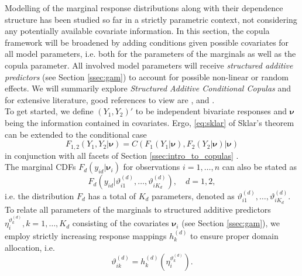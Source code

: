 
Modelling of the marginal response distributions along with their dependence structure has been studied so far in a strictly parametric context, not considering any potentially available covariate information. In this section, the copula framework will be broadened by adding conditions given possible covariates for all model parameters, i.e. both for the parameters of the marginals as well as the copula parameter. All involved model parameters will receive \textit{structured additive predictors} (see Section \ref{ssec:gam}) to account for possible non-linear or random effects. We will summarily explore \textit{Structured Additive Conditional Copulas} and for extensive literature, good references to view are \cite{klein2016simultaneous}, \cite{vatter2019gamcopula} and \cite{marra1605bivariate}. \\

To get started, we define $(Y_1, Y_2)'$ to be independent bivariate responses and $\bm{\nu}$ being the information contained in covariates. Ergo, \autoref{eq:sklar} of Sklar's theorem can be extended to the conditional case
\begin{equation}
F_{1,2}\left(Y_{1}, Y_{2} | \bm{\nu} \right)=C\left(F_{1}\left(Y_{1} | \bm{\nu} \right), F_{2}\left(Y_{2} | \bm{\nu} \right) | \bm{\nu} \right)
\label{eq:sklar_conditional}
\end{equation}
in conjunction with all facets of Section \ref{ssec:intro_to_copulas} \citep{patton2006modelling}.\\
The marginal \acp{CDF} $F_{d}\left(y_{i d} | \bm{\nu}_i\right)$ for observations $i = 1,\ldots, n$ can also be stated as
\begin{equation}
F_{d}\left(y_{i d} | \vartheta_{i 1}^{(d)}, \ldots, \vartheta_{i K_{d}}^{(d)}\right), \quad d = 1, 2,
\end{equation}
i.e. the distribution $F_d$ has a total of $K_d$ parameters, denoted as $\vartheta_{i 1}^{(d)}, \ldots, \vartheta_{i K_{d}}^{(d)}$.
To relate all parameters of the marginals to structured additive predictors $\eta_i^{\vartheta_k^{(d)}},  k = 1,\ldots, K_d$ consisting of the covariates $\bm{\nu}_i$ (see Section \ref{ssec:gam}), we employ strictly increasing response mappings $h_k^{(d)}$ to ensure proper domain allocation, i.e.
\begin{equation}
\vartheta_{i k}^{(d)}=h_{k}^{(d)}(\eta_{i}^{\vartheta_{k}^{(d)}}).
\label{eq:parameter_mapping}
\end{equation}
\\


